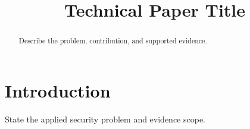 \documentclass[conference,compsoc,letterpaper]{IEEEtran}
\title{Technical Paper Title}
\author{}
\begin{document}
\maketitle
\begin{abstract}
Describe the problem, contribution, and supported evidence.
\end{abstract}
\section{Introduction}
State the applied security problem and evidence scope.
\end{document}
